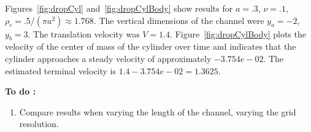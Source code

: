 Figures~\ref{fig:dropCyl} and~\ref{fig:dropCylBody} show results for $a=.3$, $\nu=.1$, $\rho_c=.5/(\pi a^2)\approx 1.768 $.
The vertical dimensions of the channel were $y_a=-2$, $y_b=3$.
The translation velocity was $V=1.4$. 
Figure~\ref{fig:dropCylBody} plots the velocity of the center of mass of the cylinder over time
and indicates that the cylinder approaches a steady velocity of approximately $-3.754e-02$.
The estimated terminal velocity is  $1.4 -3.754e-02 = 1.3625$.


{\bf To do :} 
\begin{enumerate}
  \item Compare results when varying the length of the channel, varying the grid resolution.
\end{enumerate}